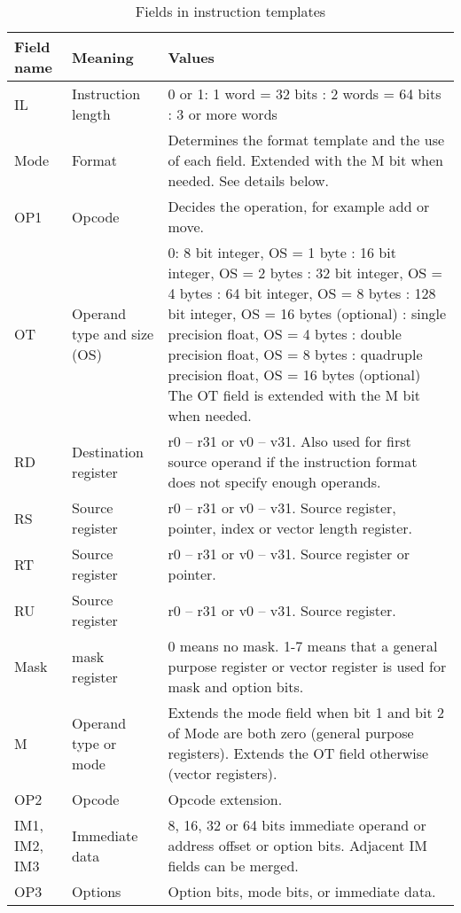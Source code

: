 \documentclass[forwardcom.tex]{subfiles}
\begin{document}
\begin{longtable} {|p{16mm}|p{16mm}|p{85mm}|}
\caption{Fields in instruction templates} \label{table:fieldsInTemplates} \\
\endfirsthead
\endhead
\hline
Field name & Meaning & Values  \\
\hline
IL & Instruction length & 0 or 1: 1 word = 32 bits \newline
2: 2 words = 64 bits \newline
3: 3 or more words  \\
\hline
Mode & Format & Determines the format template and the use of each field. 
Extended with the M bit when needed. \newline 
See details below. \\
\hline
OP1 & Opcode & Decides the operation, for example add or move.  \\
\hline
OT & Operand type and size (OS) & 
0: 8 bit integer, OS = 1 byte  \newline
1: 16 bit integer, OS = 2 bytes \newline
2: 32 bit integer, OS = 4 bytes \newline
3: 64 bit integer, OS = 8 bytes \newline
4: 128 bit integer, OS = 16 bytes (optional) \newline
5: single precision float, OS = 4 bytes \newline
6: double precision float, OS = 8 bytes \newline
7: quadruple precision float, OS = 16 bytes (optional) \newline
The OT field is extended with the M bit when needed. \\
\hline
RD & Destination register & r0 – r31 or v0 – v31. Also used for first source operand if the instruction format does not specify enough operands. \\
\hline
RS & Source register & r0 – r31 or v0 – v31. Source register, pointer, index or vector length register. \\
\hline
RT & Source register & r0 – r31 or v0 – v31. Source register or pointer.  \\
\hline
RU & Source register & r0 – r31 or v0 – v31. Source register. \\
\hline
Mask & mask register & 0 means no mask. 1-7 means that a general purpose register or vector register is used for mask and option bits.  \\
\hline
M & Operand type or mode & Extends the mode field when bit 1 and bit 2 of Mode are both zero (general purpose registers). Extends the OT field otherwise (vector registers).  \\
\hline
OP2 & Opcode & Opcode extension. \\
\hline
IM1, IM2, IM3 & Immediate data & 8, 16, 32 or 64 bits immediate operand or address offset or option bits. Adjacent IM fields can be merged. \\
\hline
OP3 & Options & Option bits, mode bits, or immediate data. \\
\hline
\end{longtable}
\vspace{2mm}
\end{document}
